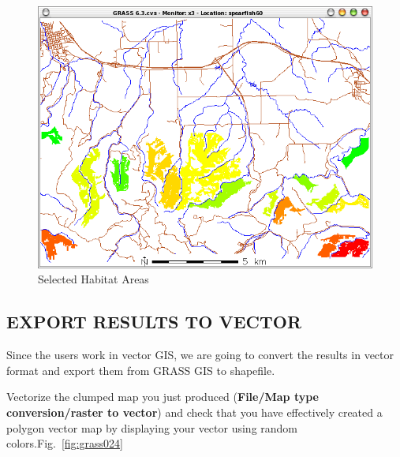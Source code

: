 \begin{figure}[htbp]
   \centering
   \includegraphics[scale=0.35]{grass023.png}
   \caption{Selected Habitat Areas}
   \label{fig:grass023}
\end{figure}

\subsection{EXPORT RESULTS TO VECTOR}
Since the users work in vector GIS, we are going to convert the results in vector format and export them from GRASS GIS to shapefile.

Vectorize the clumped map you just produced (\textbf{File/Map type conversion/raster to vector}) and check that you have effectively created a polygon vector map by displaying your vector using random colors.Fig.~\ref{fig:grass024}

